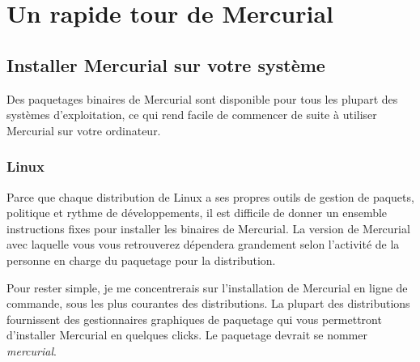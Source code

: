 \chapter{Un rapide tour de Mercurial}
\label{chap:tour-basic}

\section{Installer Mercurial sur votre système}
\label{sec:tour:install}

Des paquetages binaires de Mercurial sont disponible pour tous les plupart
des systèmes d'exploitation, ce qui rend facile de commencer de suite
à utiliser Mercurial sur votre ordinateur.

\subsection{Linux}

Parce que chaque distribution de Linux a ses propres outils de gestion
de paquets, politique et rythme de développements, il est difficile de
donner un ensemble instructions fixes pour installer les binaires de
Mercurial. La version de Mercurial avec laquelle vous vous retrouverez
dépendera grandement selon l'activité de la personne en charge du paquetage
pour la distribution.

Pour rester simple, je me concentrerais sur l'installation de Mercurial
en ligne de commande, sous les plus courantes des distributions. La 
plupart des distributions fournissent des gestionnaires graphiques de
paquetage qui vous permettront d'installer Mercurial en quelques clicks.
Le paquetage devrait se nommer \textit{mercurial}.

